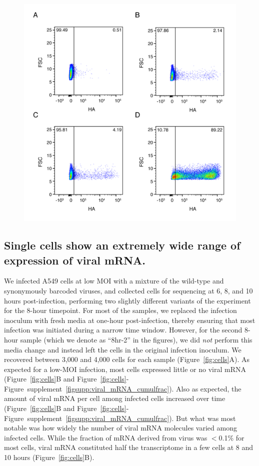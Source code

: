\documentclass[9pt,lineno]{elife}
\begin{document}
\begin{figure}
{}{\includegraphics[width=0.7\linewidth]{figures/Validating_barcode_virus/HA_stain_supplement.png}}
\end{figure}

\subsection{Single cells show an extremely wide range of expression of viral mRNA.}
We infected A549 cells at low MOI with a mixture of the wild-type and synonymously barcoded viruses, and collected cells for sequencing at 6, 8, and 10 hours post-infection, performing two slightly different variants of the experiment for the 8-hour timepoint.
For most of the samples, we replaced the infection inoculum with fresh media at one-hour post-infection, thereby ensuring that most infection was initiated during a narrow time window.
However, for the second 8-hour sample (which we denote as ``8hr-2'' in the figures), we did \emph{not} perform this media change and instead left the cells in the original infection inoculum.
We recovered between 3,000 and 4,000 cells for each sample (Figure~\ref{fig:cells}A). 
As expected for a low-MOI infection, most cells expressed little or no viral mRNA (Figure~\ref{fig:cells}B and Figure~\ref{fig:cells}-Figure~supplement~\ref{figsupp:viral_mRNA_cumulfrac}).
Also as expected, the amount of viral mRNA per cell among infected cells increased over time (Figure~\ref{fig:cells}B and Figure~\ref{fig:cells}-Figure~supplement~\ref{figsupp:viral_mRNA_cumulfrac}).
But what was most notable was how widely the number of viral mRNA molecules varied among infected cells.
While the fraction of mRNA derived from virus was $<$0.1\% for most cells, viral mRNA constituted half the transcriptome in a few cells at 8 and 10 hours (Figure~\ref{fig:cells}B).
\end{document}
